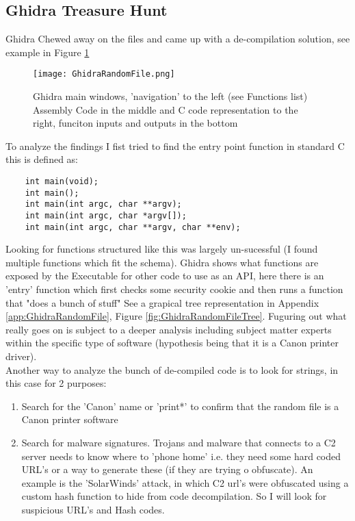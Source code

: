 \documentclass[
	letterpaper, %
	10pt, %
	unnumberedsections, %
	twoside, %
]{APAAssignment}
\begin{document}
\subsection{Ghidra Treasure Hunt}
Ghidra Chewed away on the files and came up with a de-compilation solution, see example in Figure \ref{fig:Ghidra}

\begin{figure}[!htp] %
	\centering
	\texttt{[image: GhidraRandomFile.png]}
	\caption{Ghidra main windows, 'navigation' to the left (see Functions list) Assembly Code in the middle and C code representation to the right, funciton inputs and outputs in the bottom}
	\label{fig:Ghidra}
\end{figure}



To analyze the findings I fist tried to find the entry point function in standard C this is defined as:
\begin{verbatim}
	int main(void);
	int main();
	int main(int argc, char **argv);
	int main(int argc, char *argv[]);
	int main(int argc, char **argv, char **env);
\end{verbatim} 

Looking for functions structured like this was largely un-sucessful (I found multiple functions which fit the schema). Ghidra shows what functions are exposed by the Executable for other code to use as an API, here there is an 'entry' function which first checks some security cookie and then runs a function that "does a bunch of stuff" See a grapical tree representation in Appendix \ref{app:GhidraRandomFile}, Figure \ref{fig:GhidraRandomFileTree}. Fuguring out what really goes on is subject to a deeper analysis including subject matter experts within the specific type of software (hypothesis being that it is a Canon printer driver). \\
Another way to analyze the bunch of de-compiled code is to look for strings, in this case for 2 purposes:
\begin{enumerate}
	\item Search for the 'Canon' name or 'print*' to confirm that the random file is a Canon printer software
	\item Search for malware signatures. Trojans and malware that connects to a C2 server needs to know where to 'phone home' i.e. they need some hard coded URL's or a way to generate these (if they are trying o obfuscate). An example is the 'SolarWinds' attack, in which C2 url's were obfuscated using a custom hash function to hide from code decompilation. So I will look for suspicious URL's and Hash codes. 
\end{enumerate}
\end{document}
